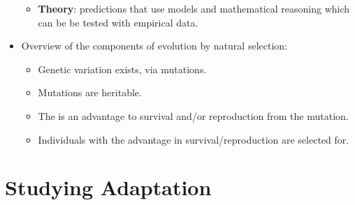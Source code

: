 \documentclass[12pt,a4paper]{article}
\begin{document}
\begin{itemize}
\begin{itemize}
            \item \textbf{Theory}: {\color{o-Sun}predictions} that use models and mathematical reasoning which can be be {\color{o-Sun}tested} with empirical data.
        \end{itemize}
    \item Overview of the components of evolution by natural selection:
        \begin{itemize}
            \item Genetic variation exists, via mutations.
            \item Mutations are heritable.
            \item The is an advantage to survival and/or reproduction from the mutation.
            \item Individuals with the advantage in survival/reproduction are selected for.
        \end{itemize}
\end{itemize}

\clearpage
\setcounter{section}{9}
\section{Studying Adaptation}
\end{document}
